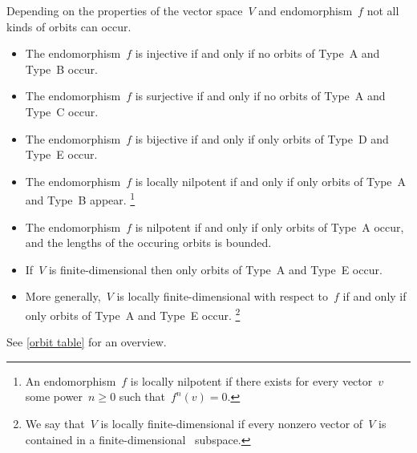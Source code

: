\documentclass[a4paper, 11pt, twoside=semi]{scrartcl}
\begin{document}
Depending on the properties of the vector space~$V$ and endomorphism~$f$ not all kinds of orbits can occur.
\begin{itemize}
  \item
    The endomorphism~$f$ is injective if and only if no orbits of Type~A and Type~B occur.
  \item
  The endomorphism~$f$ is surjective if and only if no orbits of Type~A and Type~C occur.
  \item
    The endomorphism~$f$ is bijective if and only if only orbits of Type~D and Type~E occur.
  \item
    The endomorphism~$f$ is locally nilpotent if and only if only orbits of Type~A and Type~B appear.%
    \footnote{
      An endomorphism~$f$ is locally nilpotent if there exists for every vector~$v$ some power~$n \geq 0$ such that~$f^n(v) = 0$.
    }
  \item
    The endomorphism~$f$ is nilpotent if and only if only orbits of Type~A occur, and the lengths of the occuring orbits is bounded.
  \item
    If~$V$ is finite-dimensional then only orbits of Type~A and Type~E occur.
  \item
    More generally,~$V$ is locally finite-dimensional with respect to~$f$ if and only if only orbits of Type~A and Type~E occur.%
    \footnote{
      We say that~$V$ is locally finite-dimensional if every nonzero vector of~$V$ is contained in a finite-dimensional~ subspace.
    }
\end{itemize}
See \cref{orbit table} for an overview.
\end{document}
